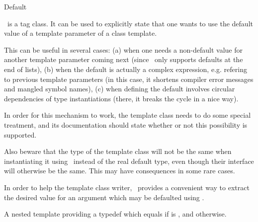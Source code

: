\begin{ccRefClass}{Default}

\ccDefinition
\ccRefName\ is a tag class.  It can be used to explicitly state that one wants
to use the default value of a template parameter of a class template.

This can be useful in several cases: (a) when one needs a non-default value for
another template parameter coming next (since \CC\ only supports defaults at
the end of lists), (b) when the default is actually a complex expression, e.g.
refering to previous template parameters (in this case, it shortens compiler
error messages and mangled symbol names), (c) when defining the default
involves circular dependencies of type instantiations (there, it breaks the
cycle in a nice way).

In order for this mechanism to work, the template class needs to do some
special treatment, and its documentation should state whether or not this
possibility is supported.

Also beware that the type of the template class will not be the same when
instantiating it using \ccRefName\ instead of the real default type, even
though their interface will otherwise be the same.  This may have consequences
in some rare cases.

\ccIsModel
{}

\begin{ccAdvanced}

\ccTypes

In order to help the template class writer, \ccRefName\ provides a
convenient way to extract the desired value for an argument which may be
defaulted using \ccRefName.

{A nested template providing a typedef  which equals  if
 is \ccRefName, and  otherwise.}

\end{ccAdvanced}



\end{ccRefClass} 
